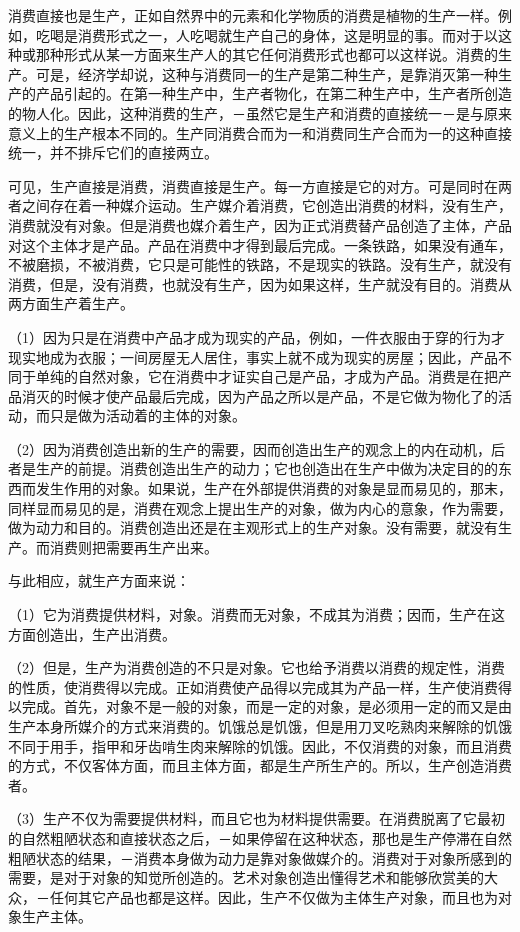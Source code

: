 \documentclass[a4paper,twoside,12pt]{ctexart}
\begin{document}
消费直接也是生产，正如自然界中的元素和化学物质的消费是植物的生产一样。例如，吃喝是消费形式之一，人吃喝就生产自己的身体，这是明显的事。而对于以这种或那种形式从某一方面来生产人的其它任何消费形式也都可以这样说。消费的生产。可是，经济学却说，这种与消费同一的生产是第二种生产，是靠消灭第一种生产的产品引起的。在第一种生产中，生产者物化，在第二种生产中，生产者所创造的物人化。因此，这种消费的生产，－虽然它是生产和消费的直接统一－是与原来意义上的生产根本不同的。生产同消费合而为一和消费同生产合而为一的这种直接统一，并不排斥它们的直接两立。

可见，生产直接是消费，消费直接是生产。每一方直接是它的对方。可是同时在两者之间存在着一种媒介运动。生产媒介着消费，它创造出消费的材料，没有生产，消费就没有对象。但是消费也媒介着生产，因为正式消费替产品创造了主体，产品对这个主体才是产品。产品在消费中才得到最后完成。一条铁路，如果没有通车，不被磨损，不被消费，它只是可能性的铁路，不是现实的铁路。没有生产，就没有消费，但是，没有消费，也就没有生产，因为如果这样，生产就没有目的。消费从两方面生产着生产。

（1）因为只是在消费中产品才成为现实的产品，例如，一件衣服由于穿的行为才现实地成为衣服；一间房屋无人居住，事实上就不成为现实的房屋；因此，产品不同于单纯的自然对象，它在消费中才证实自己是产品，才成为产品。消费是在把产品消灭的时候才使产品最后完成，因为产品之所以是产品，不是它做为物化了的活动，而只是做为活动着的主体的对象。

（2）因为消费创造出新的生产的需要，因而创造出生产的观念上的内在动机，后者是生产的前提。消费创造出生产的动力；它也创造出在生产中做为决定目的的东西而发生作用的对象。如果说，生产在外部提供消费的对象是显而易见的，那末，同样显而易见的是，消费在观念上提出生产的对象，做为内心的意象，作为需要，做为动力和目的。消费创造出还是在主观形式上的生产对象。没有需要，就没有生产。而消费则把需要再生产出来。

与此相应，就生产方面来说：

（1）它为消费提供材料，对象。消费而无对象，不成其为消费；因而，生产在这方面创造出，生产出消费。

（2）但是，生产为消费创造的不只是对象。它也给予消费以消费的规定性，消费的性质，使消费得以完成。正如消费使产品得以完成其为产品一样，生产使消费得以完成。首先，对象不是一般的对象，而是一定的对象，是必须用一定的而又是由生产本身所媒介的方式来消费的。饥饿总是饥饿，但是用刀叉吃熟肉来解除的饥饿不同于用手，指甲和牙齿啃生肉来解除的饥饿。因此，不仅消费的对象，而且消费的方式，不仅客体方面，而且主体方面，都是生产所生产的。所以，生产创造消费者。

（3）生产不仅为需要提供材料，而且它也为材料提供需要。在消费脱离了它最初的自然粗陋状态和直接状态之后，－如果停留在这种状态，那也是生产停滞在自然粗陋状态的结果，－消费本身做为动力是靠对象做媒介的。消费对于对象所感到的需要，是对于对象的知觉所创造的。艺术对象创造出懂得艺术和能够欣赏美的大众，－任何其它产品也都是这样。因此，生产不仅做为主体生产对象，而且也为对象生产主体。
\end{document}
